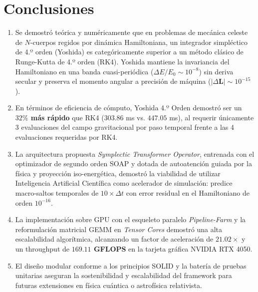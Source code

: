 \documentclass[11pt,a4paper]{article}
\begin{document}
\section{Conclusiones}
\begin{enumerate}
    \item Se demostró teórica y numéricamente que en problemas de mecánica celeste de $N$-cuerpos regidos por dinámica Hamiltoniana, un integrador simpléctico de 4.º orden (Yoshida) es categóricamente superior a un método clásico de Runge-Kutta de 4.º orden (RK4). Yoshida mantiene la invariancia del Hamiltoniano en una banda cuasi-periódica ($\Delta E/E_0 \sim 10^{-8}$) sin deriva secular y preserva el momento angular a precisión de máquina ($|\Delta \mathbf{L}| \sim 10^{-15}$).
    \item En términos de eficiencia de cómputo, Yoshida 4.º Orden demostró ser un \textbf{$32\%$ más rápido} que RK4 ($303.86$ ms vs. $447.05$ ms), al requerir únicamente 3 evaluaciones del campo gravitacional por paso temporal frente a las 4 evaluaciones requeridas por RK4.
    \item La arquitectura propuesta \textit{Symplectic Transformer Operator}, entrenada con el optimizador de segundo orden SOAP y dotada de autoatención guiada por la física y proyección iso-energética, demostró la viabilidad de utilizar Inteligencia Artificial Científica como acelerador de simulación: predice macro-saltos temporales de $10\times \Delta t$ con error residual en el Hamiltoniano de orden $10^{-16}$.
    \item La implementación sobre GPU con el esqueleto paralelo \textit{Pipeline-Farm} y la reformulación matricial GEMM en \textit{Tensor Cores} demostró una alta escalabilidad algorítmica, alcanzando un factor de aceleración de \textbf{$21.02\times$} y un throughput de \textbf{$169.11$ GFLOPS} en la tarjeta gráfica NVIDIA RTX 4050.
    \item El diseño modular conforme a los principios SOLID y la batería de pruebas unitarias aseguran la sostenibilidad y escalabilidad del framework para futuras extensiones en física cuántica o astrofísica relativista.
\end{enumerate}
\end{document}
